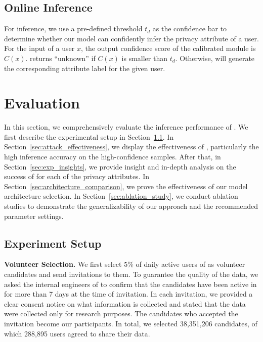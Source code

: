 \subsection{Online Inference} 

For inference, we use a pre-defined threshold $t_d$ as the confidence bar to
determine whether our model can confidently infer the privacy attribute of a
user. For the input of a user $x$, the output confidence score of the calibrated
module is $C(x)$. \tool returns ``unknown'' if $C(x)$ is smaller than $t_d$.
Otherwise, \tool will generate the corresponding attribute label for the given user.



\section{Evaluation}


In this section, we comprehensively evaluate the inference performance of \tool. 
We first describe the experimental setup in Section~\ref{sec:exp_setup}. 
In Section~\ref{sec:attack_effectiveness}, we
display the effectiveness of \tool, particularly the high inference accuracy
on the high-confidence samples. After that, in Section~\ref{sec:exp_insights},
we provide insight and in-depth analysis on the success
of \tool for each of the privacy attributes. In Section~\ref{sec:architecture_comparison}, we prove the effectiveness of our model architecture selection.
In Section~\ref{sec:ablation_study}, we conduct ablation studies to
demonstrate the generalizability of our approach and the recommended parameter
settings. 


\noindent{} 


\subsection{Experiment Setup}
\label{sec:exp_setup}


\textbf{Volunteer Selection.}
We first select 5\% of daily active users of \alipay as volunteer candidates and
send invitations to them. To guarantee the quality of the data, we asked the
internal engineers of \alipay to confirm that the candidates have been active in
\alipay for more than 7 days at the time of invitation. In each invitation, we
provided a clear consent notice on what information is collected and stated
that the data were collected only for research purposes. The candidates who
accepted the invitation become our participants. In total, we selected
38,351,206 candidates, of which 288,895 users agreed to share their data. 


